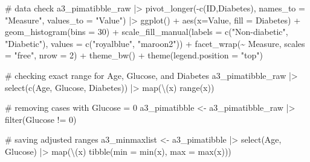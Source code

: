 \documentclass[
  english,
  11pt,
]{article}
\newenvironment{Shaded}{\begin{snugshade}}{\end{snugshade}}
\newcommand{\AttributeTok}[1]{\textcolor[rgb]{0.40,0.45,0.13}{#1}}
\newcommand{\CommentTok}[1]{\textcolor[rgb]{0.37,0.37,0.37}{#1}}
\newcommand{\DecValTok}[1]{\textcolor[rgb]{0.68,0.00,0.00}{#1}}
\newcommand{\FunctionTok}[1]{\textcolor[rgb]{0.28,0.35,0.67}{#1}}
\newcommand{\NormalTok}[1]{\textcolor[rgb]{0.00,0.23,0.31}{#1}}
\newcommand{\OtherTok}[1]{\textcolor[rgb]{0.00,0.23,0.31}{#1}}
\newcommand{\SpecialCharTok}[1]{\textcolor[rgb]{0.37,0.37,0.37}{#1}}
\newcommand{\StringTok}[1]{\textcolor[rgb]{0.13,0.47,0.30}{#1}}
\begin{document}
\begin{Shaded}
\begin{Highlighting}[]
\CommentTok{\# data check}
\NormalTok{  a3\_pimatibble\_raw }\SpecialCharTok{|\textgreater{}}
  \FunctionTok{pivot\_longer}\NormalTok{(}\SpecialCharTok{{-}}\FunctionTok{c}\NormalTok{(ID,Diabetes),}
               \AttributeTok{names\_to =} \StringTok{"Measure"}\NormalTok{,}
               \AttributeTok{values\_to =} \StringTok{"Value"}\NormalTok{) }\SpecialCharTok{|\textgreater{}}
  \FunctionTok{ggplot}\NormalTok{() }\SpecialCharTok{+}
  \FunctionTok{aes}\NormalTok{(}\AttributeTok{x=}\NormalTok{Value, }\AttributeTok{fill =}\NormalTok{ Diabetes) }\SpecialCharTok{+}
  \FunctionTok{geom\_histogram}\NormalTok{(}\AttributeTok{bins =} \DecValTok{30}\NormalTok{) }\SpecialCharTok{+}
  \FunctionTok{scale\_fill\_manual}\NormalTok{(}\AttributeTok{labels =} \FunctionTok{c}\NormalTok{(}\StringTok{"Non{-}diabetic"}\NormalTok{, }\StringTok{"Diabetic"}\NormalTok{),}
                      \AttributeTok{values =} \FunctionTok{c}\NormalTok{(}\StringTok{"royalblue"}\NormalTok{, }\StringTok{"maroon2"}\NormalTok{)) }\SpecialCharTok{+}
  \FunctionTok{facet\_wrap}\NormalTok{(}\SpecialCharTok{\textasciitilde{}}\NormalTok{ Measure, }\AttributeTok{scales =} \StringTok{"free"}\NormalTok{, }\AttributeTok{nrow =} \DecValTok{2}\NormalTok{) }\SpecialCharTok{+}
  \FunctionTok{theme\_bw}\NormalTok{() }\SpecialCharTok{+}
  \FunctionTok{theme}\NormalTok{(}\AttributeTok{legend.position =} \StringTok{"top"}\NormalTok{)}

\CommentTok{\# checking exact range for Age, Glucose, and Diabetes}
\NormalTok{a3\_pimatibble\_raw }\SpecialCharTok{|\textgreater{}}
  \FunctionTok{select}\NormalTok{(}\FunctionTok{c}\NormalTok{(Age, Glucose, Diabetes)) }\SpecialCharTok{|\textgreater{}}
  \FunctionTok{map}\NormalTok{(\textbackslash{}(x) }\FunctionTok{range}\NormalTok{(x))}

\CommentTok{\# removing cases with Glucose = 0}
\NormalTok{a3\_pimatibble }\OtherTok{\textless{}{-}}
\NormalTok{  a3\_pimatibble\_raw }\SpecialCharTok{|\textgreater{}}
  \FunctionTok{filter}\NormalTok{(Glucose }\SpecialCharTok{!=} \DecValTok{0}\NormalTok{)}

\CommentTok{\# saving adjusted ranges}
\NormalTok{a3\_minmaxlist }\OtherTok{\textless{}{-}}
\NormalTok{  a3\_pimatibble }\SpecialCharTok{|\textgreater{}}
  \FunctionTok{select}\NormalTok{(Age, Glucose) }\SpecialCharTok{|\textgreater{}}
  \FunctionTok{map}\NormalTok{(\textbackslash{}(x) }\FunctionTok{tibble}\NormalTok{(}\AttributeTok{min =} \FunctionTok{min}\NormalTok{(x), }\AttributeTok{max =} \FunctionTok{max}\NormalTok{(x)))}


\end{Highlighting}
\end{Shaded}
\end{document}
